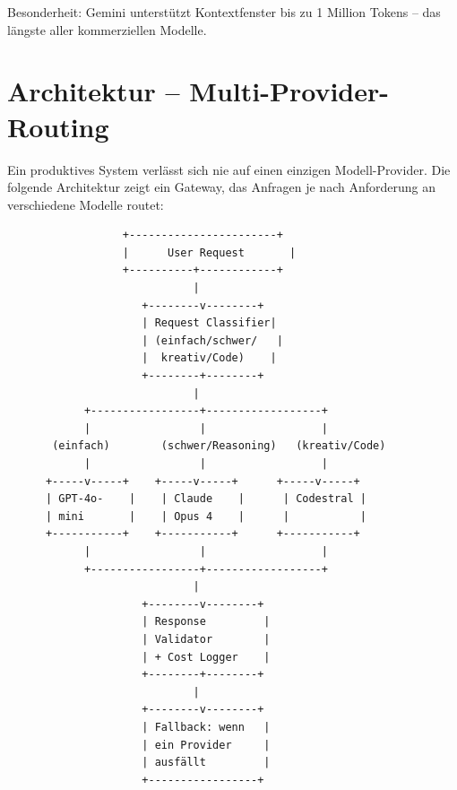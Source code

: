 Besonderheit: Gemini unterstützt Kontextfenster bis zu 1 Million Tokens -- das längste aller kommerziellen Modelle.


\section{Architektur -- Multi-Provider-Routing}

Ein produktives System verlässt sich nie auf einen einzigen Modell-Provider. Die folgende Architektur zeigt ein Gateway, das Anfragen je nach Anforderung an verschiedene Modelle routet:

\begin{verbatim}
                  +-----------------------+
                  |      User Request       |
                  +----------+------------+
                             |
                     +--------v--------+
                     | Request Classifier|
                     | (einfach/schwer/   |
                     |  kreativ/Code)    |
                     +--------+--------+
                             |
            +-----------------+------------------+
            |                 |                  |
       (einfach)        (schwer/Reasoning)   (kreativ/Code)
            |                 |                  |
      +-----v-----+    +-----v-----+      +-----v-----+
      | GPT-4o-    |    | Claude    |      | Codestral |
      | mini       |    | Opus 4    |      |           |
      +-----------+    +-----------+      +-----------+
            |                 |                  |
            +-----------------+------------------+
                             |
                     +--------v--------+
                     | Response         |
                     | Validator        |
                     | + Cost Logger    |
                     +--------+--------+
                             |
                     +--------v--------+
                     | Fallback: wenn   |
                     | ein Provider     |
                     | ausfällt         |
                     +-----------------+
\end{verbatim}

